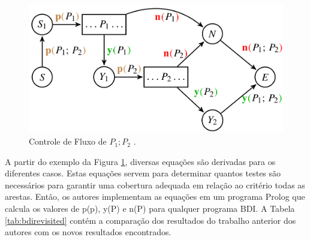 \begin{figure}[ht]
\centering
\includegraphics[scale=0.3]{imagens/grafop1p2.png}
\caption{Controle de Fluxo de $P_{1};P_{2}$ \cite{winikoff2017bdi}.}
\label{fig:grafop1p2}
\end{figure}

A partir do exemplo da Figura \ref{fig:grafop1p2}, diversas equações são derivadas para os diferentes casos. Estas equações servem para determinar quantos testes são necessários para garantir uma cobertura adequada em relação ao critério todas as arestas. Então, os autores implementam as equações em um programa Prolog que calcula os valores de p(p), y(P) e n(P) para qualquer programa BDI. A Tabela \ref{tab:bdirevisited} contém a comparação dos resultados do trabalho anterior dos autores \cite{winikoff2014testability} com os novos resultados encontrados.

